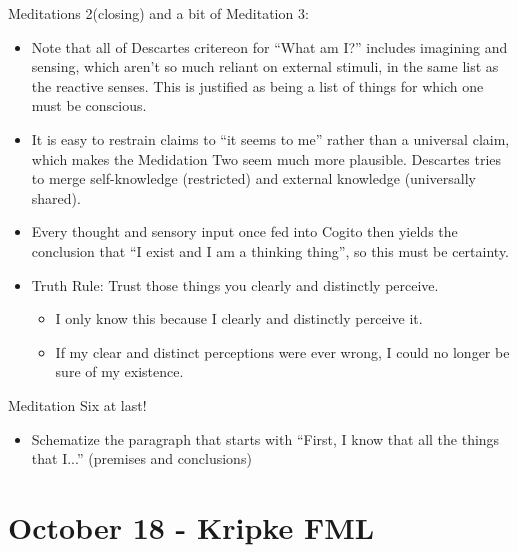 \documentclass{report}
\begin{document}
Meditations 2(closing) and a bit of Meditation 3:
\begin{itemize}
\item Note that all of Descartes critereon for "`What am I?"' includes imagining and sensing, which aren't so much reliant on external stimuli, in the same list as the reactive senses. This is justified as being a list of things for which one must be conscious.
\item It is easy to restrain claims to "`it seems to me"' rather than a universal claim, which makes the Medidation Two seem much more plausible. Descartes tries to merge self-knowledge (restricted) and external knowledge (universally shared).
\item Every thought and sensory input once fed into Cogito then yields the conclusion that "`I exist and I am a thinking thing"', so this must be certainty.
\item Truth Rule: Trust those things you clearly and distinctly perceive. \begin{itemize}
\item I only know this because I clearly and distinctly perceive it.
\item If my clear and distinct perceptions were ever wrong, I could no longer be sure of my existence.
\end{itemize}
\end{itemize}

Meditation Six at last!
\begin{itemize}
\item Schematize the paragraph that starts with "`First, I know that all the things that I..."' (premises and conclusions)
\end{itemize}

\section{October 18 - Kripke FML}
\end{document}
